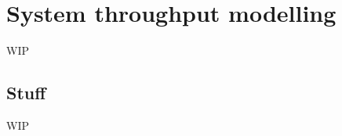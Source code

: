 \begin{colsection}
\begin{colsection}
\clearpage

\end{colsection}


\end{colsection}


\newpage
\section{System throughput modelling}
\label{sec:throughput}
\begin{colsection}


\begin{colsection}

WIP

\end{colsection}

\subsection{Stuff}
\label{sec:stuff}
\begin{colsection}

WIP

\end{colsection}


\end{colsection}


\newpage

